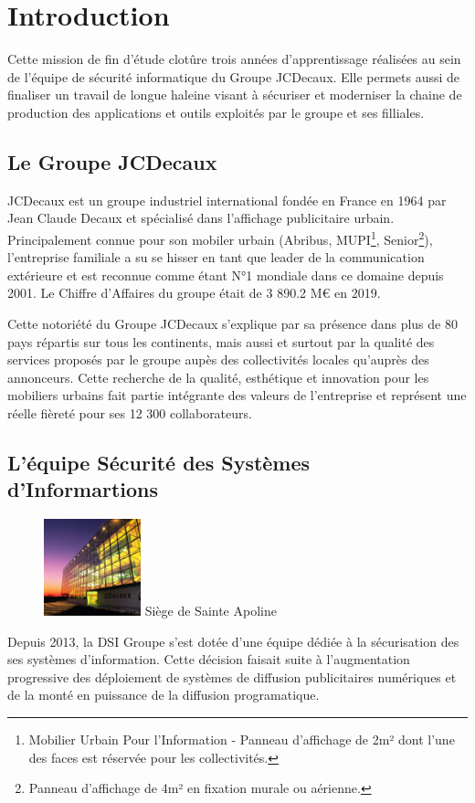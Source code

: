 \chapter{Introduction}

Cette mission de fin d'étude clotûre trois années d'apprentissage réalisées au sein de l'équipe de sécurité informatique 
du Groupe JCDecaux. Elle permets aussi de finaliser un travail de longue haleine visant à sécuriser et moderniser
la chaine de production des applications et outils exploités par le groupe et ses filliales.

\section{Le Groupe JCDecaux}
JCDecaux est un groupe industriel international fondée en France en 1964 par Jean Claude Decaux et spécialisé dans 
l'affichage publicitaire urbain. Principalement connue pour son mobiler urbain (Abribus, MUPI\footnote{Mobilier Urbain 
Pour l'Information - Panneau d'affichage de 2m² dont l'une des faces est réservée pour les collectivités.}, Senior\footnote{
Panneau d'affichage de 4m² en fixation murale ou aérienne.}), l'entreprise familiale a su se hisser en tant que leader de 
la communication extérieure et est reconnue comme étant N°1 mondiale dans ce domaine depuis 2001. Le Chiffre d'Affaires du 
groupe était de 3 890.2 M€ en 2019.

Cette notoriété du Groupe JCDecaux s'explique par sa présence dans plus de 80 pays répartis sur tous les continents, mais
aussi et surtout par la qualité des services proposés par le groupe aupès des collectivités locales qu'auprès des annonceurs.
Cette recherche de la qualité, esthétique et innovation pour les mobiliers urbains fait partie intégrante des valeurs de 
l'entreprise et représent une réelle fièreté pour ses 12 300 collaborateurs. 

\section{L'équipe Sécurité des Systèmes d'Informartions}
\begin{figure} 
    \centering \includegraphics[width=0.25\textwidth]{resources/img/jcd_pla_front.jpg}
    \centering Siège de Sainte Apoline
\end{figure}
Depuis 2013, la \ac{DSI} Groupe s'est dotée d'une équipe dédiée à la sécurisation des ses systèmes
d'information.
Cette décision faisait suite à l'augmentation progressive des déploiement de systèmes de diffusion publicitaires numériques et
de la monté en puissance de la diffusion programatique.

